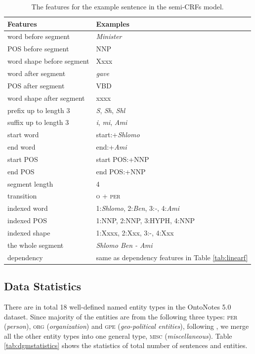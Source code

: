 \begin{table}[h!]
	\centering
	\begin{tabular}{ll}
		\toprule 
		Features & Examples \\ 
		\midrule
		word before segment & \textit{Minister} \\ 
		POS before segment & NNP \\ 
		word shape before segment & Xxxx \\ 
		word after segment & \textit{gave} \\ 
		POS after segment & VBD \\ 
		word shape after segment & xxxx \\ 
		prefix up to length 3 & \textit{S}, \textit{Sh}, \textit{Shl} \\ 
		suffix up to length 3 & \textit{i}, \textit{mi}, \textit{Ami} \\ 
		start word & start:+\textit{Shlomo} \\ 
		end word & end:+\textit{Ami} \\ 
		start POS & start POS:+NNP \\ 
		end POS & end POS:+NNP \\ 
		segment length & 4 \\ 
		transition & \textsc{o} + \textsc{per} \\ 
		indexed word & 1:\textit{Shlomo}, 2:\textit{Ben}, 3:\textit{-}, 4:\textit{Ami} \\ 
		indexed POS & 1:NNP, 2:NNP, 3:HYPH, 4:NNP \\ 
		indexed shape & 1:Xxxx, 2:Xxx, 3:-, 4:Xxx \\ 
		the whole segment & \textit{Shlomo Ben - Ami} \\ 
		dependency & same as dependency features in Table \ref{tab:linearf} \\ \bottomrule
		
	\end{tabular}\quad 
	\caption{The features for the example sentence in the semi-CRFs model.}
	\label{tab:semif}
\end{table}



\subsection{Data Statistics}
There are in total 18 well-defined named entity types in the OntoNotes 5.0 dataset. 
Since majority of the entities are from the following three types: \textsc{per} ({\em person}), \textsc{org} ({\em organization}) and \textsc{gpe} ({\em geo-political entities}), following \cite{finkel2009joint}, we merge all the other entity types into one general type, \textsc{misc} ({\em miscellaneous}). 
Table \ref{tab:dgmstatistics} shows the statistics of total number of sentences and entities.


